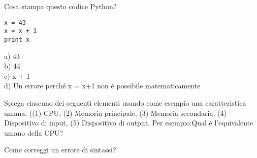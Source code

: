 \begin{ex}
Cosa stampa questo codice Python?

\beforeverb
\begin{verbatim}
x = 43
x = x + 1
print x
\end{verbatim}
\afterverb
%
a) 43\\
b) 44\\
c) x + 1\\
d) Un errore perch\'{e} x = x+1 non \`{e} possibile matematicamente
\end{ex}

\begin{ex}
Spiega ciascuno dei seguenti elementi usando come esempio una caratteristica umana:
((1) CPU, (2) Memoria principale, (3) Memoria secondaria, (4) Dispositivo di input, (5) Dispositivo di output. Per esempio:Qual \`{e} l'equivalente umano della CPU?
\end{ex}

\begin{ex}
Come correggi un errore di sintassi?
\end{ex}

